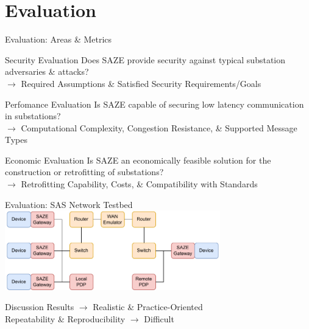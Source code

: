\documentclass[en]{sdqbeamer}
\begin{document}
\section{Evaluation}
\begin{frame}{Evaluation: Areas \& Metrics}
    \begin{greenblock}{Security Evaluation}
        Does SAZE provide security against typical substation adversaries \& attacks?
        \\$\rightarrow$ Required Assumptions \& Satisfied Security Requirements/Goals
    \end{greenblock}
    \begin{greenblock}{Perfomance Evaluation}
        Is SAZE capable of securing low latency communication in substations?
        \\$\rightarrow$ Computational Complexity, Congestion Resistance, \& Supported Message Types
    \end{greenblock}
    \begin{greenblock}{Economic Evaluation}
        Is SAZE an economically feasible solution for the construction or retrofitting of substations?
        \\$\rightarrow$ Retrofitting Capability, Costs, \& Compatibility with Standards
    \end{greenblock}
\end{frame}

\begin{frame}{Evaluation: SAS Network Testbed}
    \centering
    \includegraphics[width=0.7\textwidth]{./figures/network_testbed_color.drawio.pdf}
    \begin{blueblock}{Discussion}
        Results $\rightarrow$ Realistic \& Practice-Oriented 
        \\Repeatability \& Reproducibility $\rightarrow$ Difficult
    \end{blueblock}
\end{frame}
\end{document}
